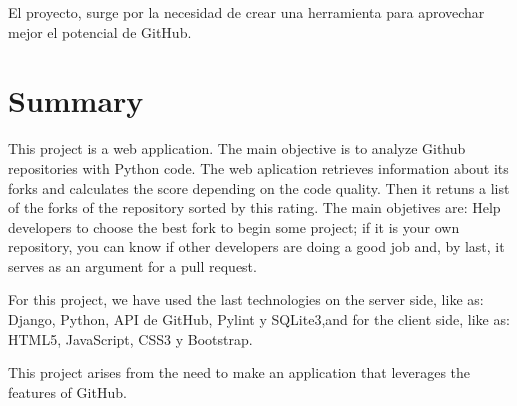 \documentclass[a4paper, 12pt]{book}
\begin{document}
El proyecto, surge por la necesidad de crear una herramienta para aprovechar mejor el potencial de GitHub.



\chapter*{Summary}

This project is a web application. The main objective is to analyze  Github repositories with Python code. The web aplication retrieves information about its forks and calculates the score depending on the code quality. Then it retuns a list of the forks of the repository sorted by this rating. The main objetives are: Help developers to choose the best fork to begin some project; if it is your own repository, you can know if other developers are doing a good job and, by last, it serves as an argument for a pull request.

For this project, we have used the last technologies on the server side, like as:  Django, Python, API de GitHub, Pylint y SQLite3,and for the client side, like as: HTML5, JavaScript, CSS3 y Bootstrap.

This project arises from the need to make an application that leverages the features of GitHub.


\tableofcontents 
\cleardoublepage
\listoffigures %


\end{document}
